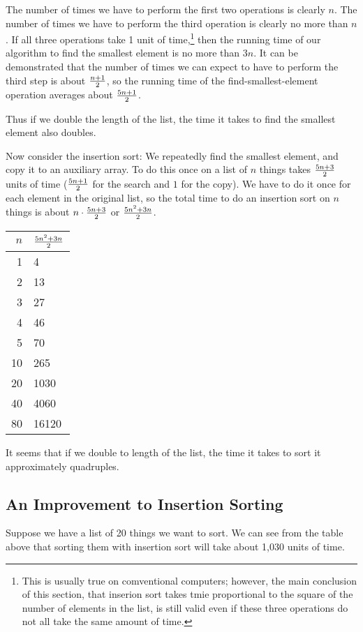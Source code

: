     The number of times we have to perform the first two operations is
clearly $n$.  The number of times we have to perform the third operation
is clearly no more than $n$.  If all three operations take 1 unit of
time,\footnote{This is usually true on comventional computers; however,
the main conclusion of this section, that inserion sort takes tmie
proportional to the square of the number of elements in the list, is
still valid even if these three operations do not all take the same
amount of time.} then the running time of our algorithm to find the
smallest element is no more than $3n$.  It can be demonstrated that the
number of times we can expect to have to perform the third step is about
$n+1\over 2$, so the running time of the find-smallest-element operation
averages about $5n+1\over 2$.

Thus if we double the length of the list, the time it takes to find the
smallest element also doubles.

Now consider the insertion sort: We repeatedly find the smallest
element, and copy it to an auxiliary array.  To do this once on a list
of $n$ things takes $5n + 3\over 2$ units of time ($5n+1\over 2$ for the
search and $1$ for the copy).  We have to do it once for each element in
the original list, so the total time to do an insertion sort on $n$
things is about $n\cdot {5n+3\over 2}$ or $5n^2 + 3n \over 2$.  

\begin{tabular}{r|l}
$n$ & $5n^2+3n\over 2$ \\ \hline
1   & 4 \\
2   & 13 \\
3   & 27 \\
4   & 46 \\
5   & 70 \\
10  & 265 \\
20  & 1030 \\
40  & 4060 \\
80  & 16120 
\end{tabular}

It seems that if we double to length of the list, the time it takes to
sort it approximately quadruples.

\subsection{An Improvement to Insertion Sorting}

Suppose we have a list of 20 things we want to sort.  We can see from
the table above that sorting them with insertion sort will take about
1,030 units of time.

